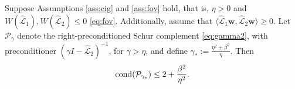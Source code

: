 \documentclass[review]{siamart}
\begin{document}
%
\begin{theorem}\label{th:cond}
Suppose Assumptions \ref{ass:eig} and \ref{ass:fov} hold, that is, $\eta > 0$
and $W(\widehat{\mathcal{L}}_1),W(\widehat{\mathcal{L}}_2) \leq 0$ \eqref{eq:fov}.
Additionally, assume that $\langle\widehat{\mathcal{L}}_1\mathbf{w},
\widehat{\mathcal{L}}_2\mathbf{w}\rangle\geq 0$. Let $\mathcal{P}_\gamma$
denote the right-preconditioned Schur complement \eqref{eq:gamma2}, with
preconditioner $(\gamma I - \widehat{\mathcal{L}}_2)^{-1}$, for $\gamma >\eta$,
and define $\gamma_* := \tfrac{\eta^2+\beta^2}{\eta}$. Then
\begin{align}\label{eq:gammastar_cond}
\textnormal{cond}(\mathcal{P}_{\gamma_*}) \leq 
	2 + \frac{\beta^2}{\eta^2}.
\end{align}
\end{theorem}
\end{document}
